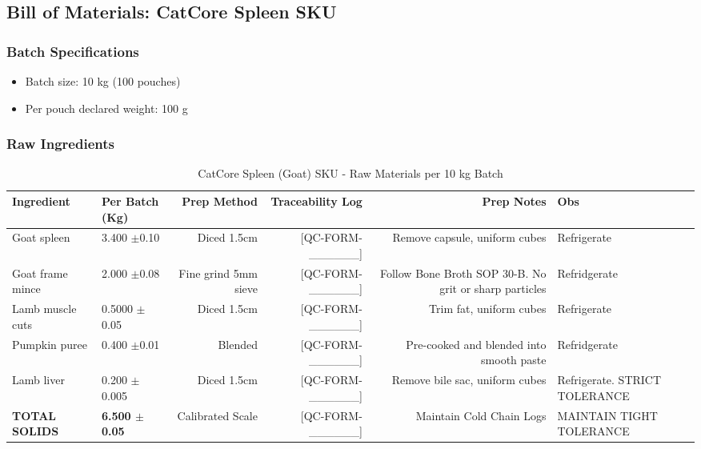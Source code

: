 \subsection*{Bill of Materials: CatCore Spleen SKU}
\label{bom:catcore_heart}

\subsubsection*{Batch Specifications}
\begin{itemize}
\item Batch size: 10 kg (100 pouches)
\item Per pouch declared weight: 100 g
\end{itemize}

\subsubsection*{Raw Ingredients}
\begin{table}[h]
\centering
\caption{CatCore Spleen (Goat) SKU - Raw Materials per 10 kg Batch}
\begin{tabular}{@{}llrrrp{4cm}@{}}
\toprule
\textbf{Ingredient} & \textbf{Per Batch (Kg)} & \textbf{Prep Method}  & \textbf{Traceability Log} & \textbf{Prep Notes} & \textbf{Obs}\\
\midrule
Goat spleen         & 3.400 $\pm$0.10  & Diced 1.5cm            & [QC-FORM-\_\_\_\_\_\_] & Remove capsule, uniform cubes & Refrigerate\\
Goat frame mince    & 2.000 $\pm$0.08  & Fine grind 5mm sieve   & [QC-FORM-\_\_\_\_\_\_] & Follow Bone Broth SOP 30-B. No grit or sharp particles & Refridgerate  \\
Lamb muscle cuts    & 0.5000 $\pm$0.05  & Diced 1.5cm            & [QC-FORM-\_\_\_\_\_\_] & Trim fat, uniform cubes & Refrigerate\\
Pumpkin puree       & 0.400 $\pm$0.01   & Blended                & [QC-FORM-\_\_\_\_\_\_] & Pre-cooked and blended into smooth paste & Refridgerate \\
Lamb liver          & 0.200 $\pm$0.005  & Diced 1.5cm            & [QC-FORM-\_\_\_\_\_\_] & Remove bile sac, uniform cubes & Refrigerate. STRICT TOLERANCE\\
\midrule
\textbf{TOTAL SOLIDS} & \textbf{6.500 $\pm$0.05} & Calibrated Scale & [QC-FORM-\_\_\_\_\_\_] & Maintain Cold Chain Logs & MAINTAIN TIGHT TOLERANCE\\
\bottomrule
\end{tabular}
\end{table}

